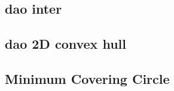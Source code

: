 \documentclass[a4paper,10pt,twocolumn,oneside]{article}
\begin{document}
\subsection{dao inter}


\subsection{dao 2D convex hull}


%

%

%

\subsection{Minimum Covering Circle}


%

%

%
\end{document}

